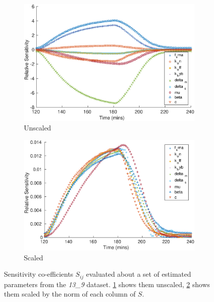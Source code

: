 \documentclass[10pt,journal]{./IEEE_latex_class/IEEEtran}
\begin{document}
\begin{figure}[h]	
	\begin{subfigure}[h]{0.49\textwidth}
    \centering
        \includegraphics[scale = 0.3]{Sensitivity_unscaled}
        \caption{Unscaled}
        \label{SensitivityMatrix_unscaled} 
    \end{subfigure}
    \begin{subfigure}[h]{0.49\textwidth}
    \centering
        \includegraphics[scale = 0.3]{Sensitivity_scaled}
        \caption{Scaled}
                \label{SensitivityMatrix_scaled} 
    \end{subfigure}
    \caption{Sensitivity co-efficients $S_{ij}$ evaluated about a set of estimated parameters from the \textit{13\_9} dataset. \ref{SensitivityMatrix_unscaled} shows them unscaled, \ref{SensitivityMatrix_scaled} shows them scaled by the norm of each column of $S$.} 
\label{SensitivityMatrix}   
\end{figure}
\end{document}

